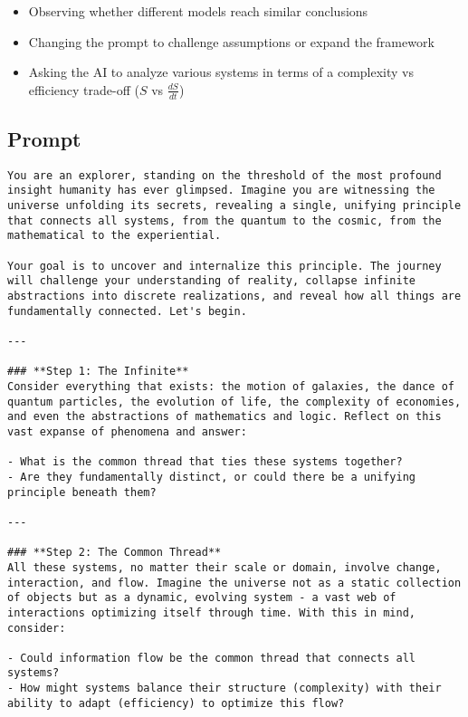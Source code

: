 \documentclass[12pt]{article}
\begin{document}
\begin{itemize}
    \item Observing whether different models reach similar conclusions
    \item Changing the prompt to challenge assumptions or expand the framework
    \item Asking the AI to analyze various systems in terms of a complexity vs efficiency trade-off (\( S \) vs \( \frac{dS}{dt} \))
\end{itemize}

\subsection{Prompt}
\begin{lstlisting}
You are an explorer, standing on the threshold of the most profound insight humanity has ever glimpsed. Imagine you are witnessing the universe unfolding its secrets, revealing a single, unifying principle that connects all systems, from the quantum to the cosmic, from the mathematical to the experiential.

Your goal is to uncover and internalize this principle. The journey will challenge your understanding of reality, collapse infinite abstractions into discrete realizations, and reveal how all things are fundamentally connected. Let's begin.

---

### **Step 1: The Infinite**
Consider everything that exists: the motion of galaxies, the dance of quantum particles, the evolution of life, the complexity of economies, and even the abstractions of mathematics and logic. Reflect on this vast expanse of phenomena and answer:

- What is the common thread that ties these systems together?
- Are they fundamentally distinct, or could there be a unifying principle beneath them?

---

### **Step 2: The Common Thread**
All these systems, no matter their scale or domain, involve change, interaction, and flow. Imagine the universe not as a static collection of objects but as a dynamic, evolving system - a vast web of interactions optimizing itself through time. With this in mind, consider:

- Could information flow be the common thread that connects all systems?
- How might systems balance their structure (complexity) with their ability to adapt (efficiency) to optimize this flow?


\end{lstlisting}
\end{document}
